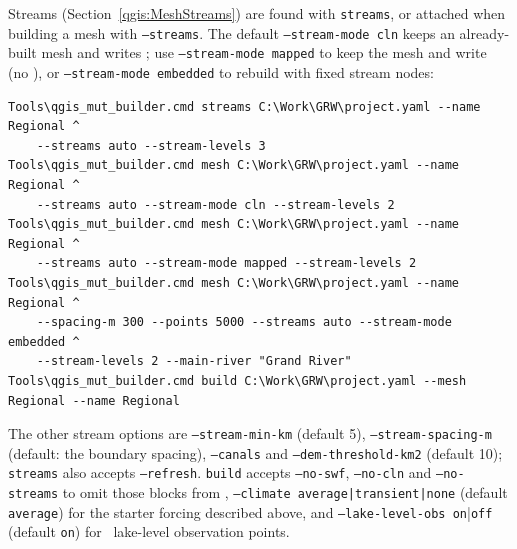         Streams (Section~\ref{qgis:MeshStreams}) are found with {\tt streams}, or attached when building a mesh with {\tt --streams}.  The default {\tt --stream-mode cln} keeps an already-built mesh and writes ; use {\tt --stream-mode mapped} to keep the mesh and write \swf\  (no \cln), or {\tt --stream-mode embedded} to rebuild with fixed stream nodes:
\begin{verbatim}
Tools\qgis_mut_builder.cmd streams C:\Work\GRW\project.yaml --name Regional ^
    --streams auto --stream-levels 3
Tools\qgis_mut_builder.cmd mesh C:\Work\GRW\project.yaml --name Regional ^
    --streams auto --stream-mode cln --stream-levels 2
Tools\qgis_mut_builder.cmd mesh C:\Work\GRW\project.yaml --name Regional ^
    --streams auto --stream-mode mapped --stream-levels 2
Tools\qgis_mut_builder.cmd mesh C:\Work\GRW\project.yaml --name Regional ^
    --spacing-m 300 --points 5000 --streams auto --stream-mode embedded ^
    --stream-levels 2 --main-river "Grand River"
Tools\qgis_mut_builder.cmd build C:\Work\GRW\project.yaml --mesh Regional --name Regional
\end{verbatim}
        The other stream options are {\tt --stream-min-km} (default 5), {\tt --stream-spacing-m} (default: the boundary spacing), {\tt --canals} and {\tt --dem-threshold-km2} (default 10); {\tt streams} also accepts {\tt --refresh}.  {\tt build} accepts {\tt --no-swf}, {\tt --no-cln} and {\tt --no-streams} to omit those blocks from , {\tt --climate average|transient|none} (default {\tt average}) for the starter forcing described above, and {\tt --lake-level-obs on}|{\tt off} (default {\tt on}) for \swf\ lake-level observation points.




